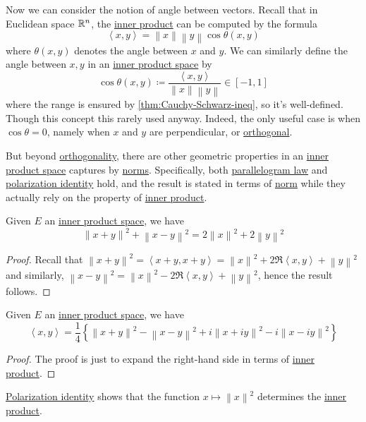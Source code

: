 Now we can consider the notion of angle between vectors. Recall that in Euclidean space \(\mathbb{\MakeUppercase{r}} ^n\), the \hyperref[def:inner-product]{inner product} can be computed by the formula
\[
	\left\langle x, y \right\rangle = \left\lVert x\right\rVert \left\lVert y\right\rVert \cos \theta (x, y)
\]
where \(\theta (x, y)\) denotes the angle between \(x\) and \(y\). We can similarly define the angle between \(x, y\) in an \hyperref[def:inner-product-space]{inner product space} by
\[
	\cos \theta (x, y) \coloneqq \frac{\left\langle x, y \right\rangle }{\left\lVert x\right\rVert \left\lVert y\right\rVert } \in [-1, 1]
\]
where the range is ensured by \autoref{thm:Cauchy-Schwarz-ineq}, so it's well-defined. Though this concept this rarely used anyway. Indeed, the only useful case is when \(\cos \theta = 0\), namely when \(x\) and \(y\) are perpendicular, or \hyperref[def:orthogonal]{orthogonal}.

But beyond \hyperref[def:orthogonal]{orthogonality}, there are other geometric properties in an \hyperref[def:inner-product-space]{inner product space} captures by \hyperref[def:norm]{norms}. Specifically, both \hyperref[lma:parallelogram-law]{parallelogram law} and \hyperref[lma:polatization-identity]{polarization identity} hold, and the result is stated in terms of \hyperref[def:norm]{norm} while they actually rely on the property of \hyperref[def:inner-product]{inner product}.

\begin{lemma}\label{lma:parallelogram-law}
	Given \(E\) an \hyperref[def:inner-product-space]{inner product space}, we have
	\[
		\left\lVert x+y\right\rVert ^{2} + \left\lVert x-y\right\rVert ^{2} = 2\left\lVert x\right\rVert ^{2} + 2\left\lVert y\right\rVert ^{2}
	\]
\end{lemma}
\begin{proof}
	Recall that \(\left\lVert x + y\right\rVert ^{2} = \left\langle x + y, x + y \right\rangle = \left\lVert x\right\rVert ^{2} + 2 \Re \left\langle x, y \right\rangle + \left\lVert y\right\rVert ^{2} \) and similarly, \(\left\lVert x - y\right\rVert ^{2} = \left\lVert x\right\rVert ^{2} - 2\Re \left\langle x, y \right\rangle + \left\lVert y\right\rVert ^{2}\), hence the result follows.
\end{proof}

\begin{lemma}\label{lma:polatization-identity}
	Given \(E\) an \hyperref[def:inner-product-space]{inner product space}, we have
	\[
		\left\langle x, y \right\rangle = \frac{1}{4}\left\{ \left\lVert x+y\right\rVert ^{2} - \left\lVert x-y\right\rVert ^{2} + i \left\lVert x+iy\right\rVert ^{2} - i\left\lVert x-iy\right\rVert ^{2}  \right\}
	\]
\end{lemma}
\begin{proof}
	The proof is just to expand the right-hand side in terms of \hyperref[def:inner-product]{inner product}.
\end{proof}

\begin{remark}
	\hyperref[lma:polatization-identity]{Polarization identity} shows that the function \(x\mapsto \left\lVert x\right\rVert ^{2} \) determines the \hyperref[def:inner-product]{inner product}.
\end{remark}